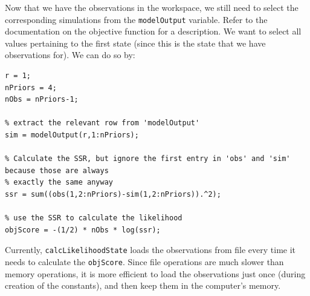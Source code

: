 


Now that we have the observations in the workspace, we still need to select the corresponding simulations from the \texttt{modelOutput} variable. Refer to the documentation on the objective function for a description. We want to select all values pertaining to the first state (since this is the state that we have observations for). We can do so by:
\begin{lstlisting}[style=basic,style=matlab]
% row of interest in 'modelOutput' is #1
r = 1;
nPriors = 4;
nObs = nPriors-1;

% extract the relevant row from 'modelOutput'
sim = modelOutput(r,1:nPriors);

% Calculate the SSR, but ignore the first entry in 'obs' and 'sim' because those are always
% exactly the same anyway
ssr = sum((obs(1,2:nPriors)-sim(1,2:nPriors)).^2);

% use the SSR to calculate the likelihood
objScore = -(1/2) * nObs * log(ssr);
\end{lstlisting}





Currently, \texttt{calcLikelihoodState} loads the observations from file every time it needs to calculate the \texttt{objScore}. Since file operations are much slower than memory operations, it is more efficient to load the observations just once (during creation of the constants), and then keep them in the computer's memory.



